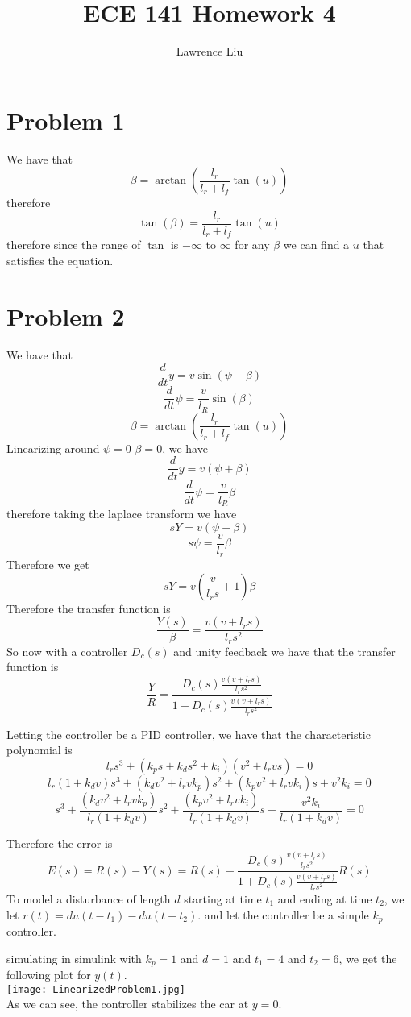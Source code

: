 \documentclass[12pt]{article}
\title{ECE 141 Homework 4}
\author{Lawrence Liu}
\begin{document}
\maketitle
\section*{Problem 1}
We have that $$\beta=\arctan(\frac{l_r}{l_r+l_f}\tan(u))$$
therefore
$$\tan(\beta)=\frac{l_r}{l_r+l_f}\tan(u)$$
therefore since the range of $\tan$ is $-\infty$ to $\infty$ for any $\beta$ we can find a $u$ that satisfies the equation.

\section*{Problem 2}
We have that
$$\frac{d}{dt}y=v\sin(\psi+\beta)$$
$$\frac{d}{dt}\psi=\frac{v}{l_R}\sin(\beta)$$
$$\beta=\arctan(\frac{l_r}{l_r+l_f}\tan(u))$$
Linearizing around $\psi=0$ $\beta=0$, we have
$$\frac{d}{dt}y=v(\psi+\beta)$$
$$\frac{d}{dt}\psi=\frac{v}{l_R}\beta$$
therefore taking the laplace transform we have
$$sY=v(\psi+\beta)$$
$$s\psi=\frac{v}{l_r}\beta$$
Therefore we get
$$sY=v(\frac{v}{l_r s}+1)\beta$$
Therefore the transfer function is
$$\frac{Y(s)}{\beta}=\frac{v(v+l_r s)}{l_r s^2}$$
So now with a controller $D_c(s)$ and unity feedback we have that the transfer function is
$$\frac{Y}{R}=\frac{D_c(s)\frac{v(v+l_r s)}{l_r s^2}}{1+D_c(s)\frac{v(v+l_r s)}{l_r s^2}}$$

Letting the controller be a PID controller, we have that the characteristic polynomial is
$$l_r s^3+(k_ps+k_ds^2+k_i)(v^2+l_r v s)=0$$
$$l_r(1+k_d v)s^3+(k_dv^2+l_r v k_p)s^2+(k_pv^2+l_r v k_i)s+v^2k_i=0$$
$$s^3+\frac{(k_dv^2+l_r v k_p)}{l_r(1+k_d v)}s^2+\frac{(k_pv^2+l_r v k_i)}{l_r(1+k_d v)}s+\frac{v^2k_i}{l_r(1+k_d v)}=0$$


Therefore the error is
$$E(s)=R(s)-Y(s)=R(s)-\frac{D_c(s)\frac{v(v+l_r s)}{l_r s^2}}{1+D_c(s)\frac{v(v+l_r s)}{l_r s^2}}R(s)$$
To model a disturbance of length $d$ starting at time $t_1$ and ending at time $t_2$, we let $r(t)=du(t-t_1)-du(t-t_2)$.
and let the controller be a simple $k_p$ controller.

simulating in simulink with $k_p=1$ and $d=1$ and $t_1=4$ and $t_2=6$, we get the following plot for $y(t)$.\\
\texttt{[image: LinearizedProblem1.jpg]}
\\As we can see, the controller stabilizes the car at $y=0$.
\end{document}
